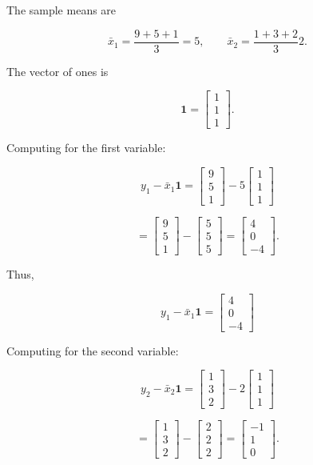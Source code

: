 \documentclass{article}
\begin{document}
The sample means are

$$
\bar{x}_1=\frac{9+5+1}{3}=5,
\qquad
\bar{x}_2=\frac{1+3+2}{3}2.
$$

The vector of ones is

$$
\mathbf{1}=
\begin{bmatrix}
1\\
1\\
1
\end{bmatrix}.
$$

Computing for the first variable:

$$
y_1-\bar{x}_1\mathbf{1}
=
\begin{bmatrix}
9\\
5\\
1
\end{bmatrix}
-
5
\begin{bmatrix}
1\\
1\\
1
\end{bmatrix}
$$

$$
=
\begin{bmatrix}
9\\
5\\
1
\end{bmatrix}
-
\begin{bmatrix}
5\\
5\\
5
\end{bmatrix}
=
\begin{bmatrix}
4\\
0\\
-4
\end{bmatrix}.
$$

Thus,

$$
\boxed{
y_1-\bar{x}_1\mathbf{1}
=
\begin{bmatrix}
4\\
0\\
-4
\end{bmatrix}}
$$

Computing for the second variable:

$$
y_2-\bar{x}_2\mathbf{1}
=
\begin{bmatrix}
1\\
3\\
2
\end{bmatrix}
-
2
\begin{bmatrix}
1\\
1\\
1
\end{bmatrix}
$$

$$
=
\begin{bmatrix}
1\\
3\\
2
\end{bmatrix}
-
\begin{bmatrix}
2\\
2\\
2
\end{bmatrix}
=
\begin{bmatrix}
-1\\
1\\
0
\end{bmatrix}.
$$
\end{document}
